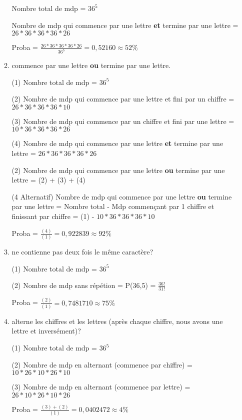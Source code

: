 \documentclass[A4paper,11pt]{article}
\begin{document}
\begin{enumerate}
\begin{enumerate}
        Nombre total de mdp = $36^5$
        
        Nombre de mdp qui commence par une lettre \textbf{et} termine par une lettre = $26*36*36*36*26$
        
        Proba = $\frac{26*36*36*36*26}{36^5} = 0,52160 \approx 52\%$
        
        
        \item  commence par une lettre \textbf{ou} termine par une lettre.
        
        (1) Nombre total de mdp = $36^5$
        
        (2) Nombre de mdp qui commence par une lettre et fini par un chiffre = $26*36*36*36*10$
        
        (3) Nombre de mdp qui commence par un chiffre et fini par une lettre = $10*36*36*36*26$
        
        (4) Nombre de mdp qui commence par une lettre \textbf{et} termine par une lettre = $26*36*36*36*26$
        
        (2) Nombre de mdp qui commence par une lettre \textbf{ou} termine par une lettre = (2) + (3) + (4)
        
        (4 Alternatif)  Nombre de mdp qui commence par une lettre \textbf{ou} termine par une lettre = Nombre total - Mdp commençant par 1 chiffre et finissant par chiffre = (1) - $10*36*36*36*10$
        
        Proba = $\frac{(4)}{(1)} = 0,922839 \approx 92\%$
        
        \item ne contienne pas deux fois le même caractère?
        
        (1) Nombre total de mdp = $36^5$
        
        (2) Nombre de mdp sans répétion = P(36,5) = $\frac{36!}{31!}$
        
        Proba = $\frac{(2)}{(1)} = 0,7481710 \approx 75\%$
        
        \item alterne les chiffres et les lettres (après chaque chiffre, nous avons une lettre et inversément)?
        
        (1) Nombre total de mdp = $36^5$
        
        (2) Nombre de mdp en alternant (commence par chiffre) = $10*26*10*26*10$
        
        (3) Nombre de mdp en alternant (commence par lettre) = $26*10*26*10*26$
        
        Proba = $\frac{(3) + (2)}{(1)} = 0,0402472 \approx 4\%$
        

\end{enumerate}
\end{enumerate}
\end{document}
